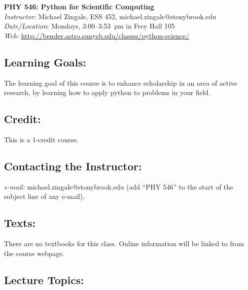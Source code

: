 \documentclass[11pt]{article}
\begin{document}
\begin{center}
{\LARGE \sffamily \bfseries PHY 546: Python for Scientific Computing} \\[3mm]
{\em Instructor}\/: Michael Zingale, ESS 452, michael.zingale@stonybrook.edu \\
{\em Date/Location}\/: Mondays, 3:00--3:53~pm in Frey Hall 105 \\
{\em Web:}\/ \url{http://bender.astro.sunysb.edu/classes/python-science/}
\end{center}

\subsection*{Learning Goals:} 

The learning goal of this course is to enhance scholarship in an area
of active research, by learning how to apply python to problems
in your field.


\subsection*{Credit:} 

This is a 1-credit course.


\subsection*{Contacting the Instructor:} 

{\em e-mail:} michael.zingale@stonybrook.edu ({add ``PHY 546'' to the
 start of the subject line of any e-mail}).
%



\subsection*{Texts:} 

There are no textbooks for this class.  Online information
will be linked to from the course webpage.


\subsection*{Lecture Topics:} 
\end{document}
